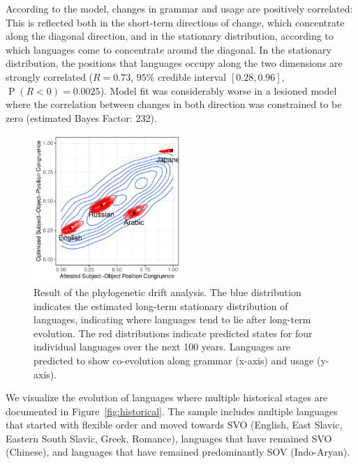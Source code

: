 \documentclass[11pt,a4paper]{article}
\begin{document}
According to the model, changes in grammar and usage are positively correlated:
This is reflected both in the short-term directions of change, which concentrate along the diagonal direction, and in the stationary distribution, according to which languages come to concentrate around the diagonal.
In the stationary distribution, the positions that languages occupy along the two dimensions are strongly correlated ($R=0.73$, $95\%$ credible interval $[0.28, 0.96]$, $\operatorname{P}(R<0) = 0.0025$). %
Model fit was considerably worse in a lesioned model where the correlation between changes in both direction was constrained to be zero (estimated Bayes Factor: 232). %


\begin{figure}
    \centering
    \includegraphics[width=0.5\textwidth]{../change/visualize/stationary.pdf}
    \caption{Result of the phylogenetic drift analysis.
    The blue distribution indicates the estimated long-term stationary distribution of languages, indicating where languages tend to lie after long-term evolution.
    The red distributions indicate predicted states for four individual languages over the next 100 years. Languages are predicted to show co-evolution along grammar (x-axis)  and usage (y-axis).}
    \label{fig:drift-model}
\end{figure}



We visualize the evolution of languages where multiple historical stages are documented in Figure~\ref{fig:historical}.
The sample includes multiple languages that started with flexible order and moved towards SVO (English, East Slavic, Eastern South Slavic, Greek, Romance), languages that have remained SVO (Chinese), and languages that have remained predominantly SOV (Indo-Aryan).
\end{document}
